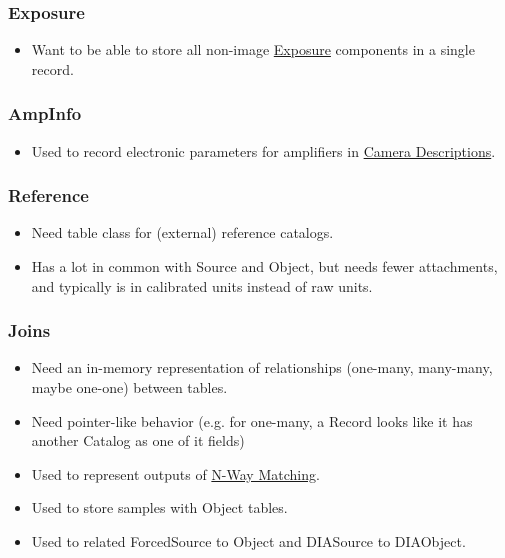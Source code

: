 \subsubsection{Exposure}
\label{sec:spTablesExposure}

\begin{itemize}
\item Want to be able to store all non-image \hyperref[sec:spImagesExposure]{Exposure} components in a single record.
\end{itemize}

\subsubsection{AmpInfo}
\label{sec:spTablesAmpInfo}

\begin{itemize}
\item Used to record electronic parameters for amplifiers in \hyperref[sec:spCameraDescriptions]{Camera Descriptions}.
\end{itemize}

\subsubsection{Reference}
\label{sec:spTablesReference}

\begin{itemize}
\item Need table class for (external) reference catalogs.
\item Has a lot in common with Source and Object, but needs fewer attachments, and typically is in calibrated units instead of raw units.
\end{itemize}

\subsubsection{Joins}
\label{sec:spTablesJoins}

\begin{itemize}
\item Need an in-memory representation of relationships (one-many, many-many, maybe one-one) between tables.
\item Need pointer-like behavior (e.g. for one-many, a Record looks like it has another Catalog as one of it fields)
\item Used to represent outputs of \hyperref[sec:spTablesNWayMatching]{N-Way Matching}.
\item Used to store samples with Object tables.
\item Used to related ForcedSource to Object and DIASource to DIAObject.
\end{itemize}

